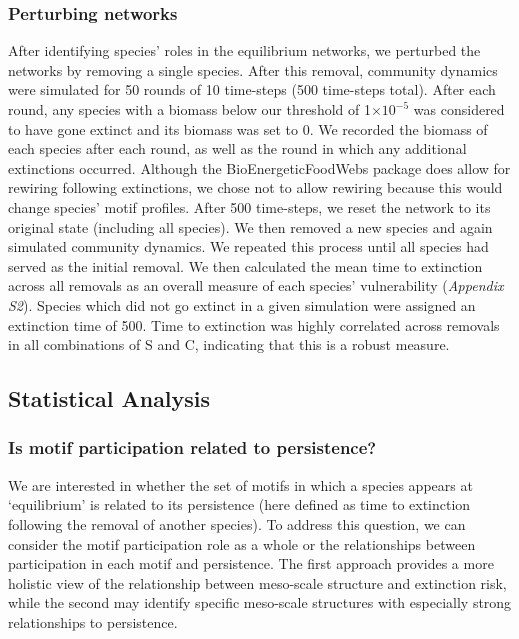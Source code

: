 \documentclass[12pt]{article}
\begin{document}
\begin{spacing}{1.0}
    	\subsubsection*{Perturbing networks}
    
    		After identifying species' roles in the equilibrium networks, we perturbed the networks by removing a single species. After this removal, community dynamics were simulated for 50 rounds of 10 time-steps (500 time-steps total). After each round, any species with a biomass below our threshold of 1$\times10^{-5}$ was considered to have gone extinct and its biomass was set to 0. We recorded the biomass of each species after each round, as well as the round in which any additional extinctions occurred. Although the BioEnergeticFoodWebs package does allow for rewiring following extinctions, we chose not to allow rewiring because this would change species' motif profiles. After 500 time-steps, we reset the network to its original state (including all species). We then removed a new species and again simulated community dynamics. We repeated this process until all species had served as the initial removal.
    		We then calculated the mean time to extinction across all removals as an overall measure of each species' vulnerability (\emph{Appendix S2}). 
    		Species which did not go extinct in a given simulation were assigned an extinction time of 500.
    		Time to extinction was highly correlated across removals in all combinations of S and C, indicating that this is a robust measure.


	\subsection*{Statistical Analysis}

        \subsubsection*{Is motif participation related to persistence?}

            We are interested in whether the set of motifs in which a species appears at `equilibrium' is related to its persistence (here defined as time to extinction following the removal of another species). 
            To address this question, we can consider the motif participation role as a whole or the relationships between participation in each motif and persistence. 
            The first approach provides a more holistic view of the relationship between meso-scale structure and extinction risk, while the second may identify specific meso-scale structures with especially strong relationships to persistence.


\end{spacing}
\end{document}
